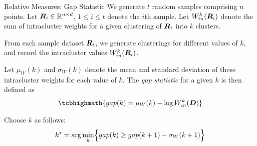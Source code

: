 \begin{frame}{Relative Measures: Gap Statistic}
We generate $t$
random samples comprising $n$ points.
Let ${\boldsymbol R}_i \in {\mathord{\mathbb R}}^{n \times d}$, $1 \le i \le t$ denote the $i$th sample.
Let $W_{in}^k({\boldsymbol R}_i)$ denote the sum of intracluster weights for a
given clustering of ${\boldsymbol R}_i$ into $k$ clusters.

\medskip
From each sample
dataset ${\boldsymbol R}_i$, we generate clusterings for different values of $k$,
and record the intracluster values
$W_{in}^k({\boldsymbol R}_i)$.

\medskip
Let $\mu_W(k)$ and $\sigma_W(k)$ denote the
mean and standard deviation of these intracluster weights for each
value of $k$.
The {\em gap statistic} for a given $k$ is then def\/{i}ned as
\begin{align*}
\tcbhighmath{
  gap(k) = \mu_W(k) - \log  W_{in}^k(\bD)
}
\end{align*}

\medskip
Choose $k$ as follows:
\begin{align*}
  k^* = \arg\min_k \Bigl\{ gap(k) \ge gap(k+1) - \sigma_W(k+1)\Bigr\}
\end{align*}
\end{frame}


